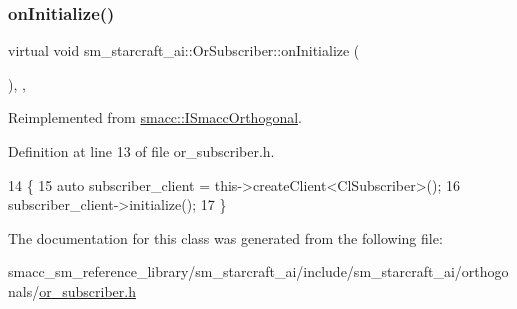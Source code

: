\subsubsection{\texorpdfstring{on\+Initialize()}{onInitialize()}}
{\footnotesize\ttfamily virtual void sm\+\_\+starcraft\+\_\+ai\+::\+Or\+Subscriber\+::on\+Initialize (\begin{DoxyParamCaption}{ }\end{DoxyParamCaption})\hspace{0.3cm}{\ttfamily [inline]}, {\ttfamily [override]}, {\ttfamily [virtual]}}



Reimplemented from \hyperlink{classsmacc_1_1ISmaccOrthogonal_a6bb31c620cb64dd7b8417f8705c79c7a}{smacc\+::\+I\+Smacc\+Orthogonal}.



Definition at line 13 of file or\+\_\+subscriber.\+h.


\begin{DoxyCode}
14     \{
15         \textcolor{keyword}{auto} subscriber\_client = this->createClient<ClSubscriber>();
16         subscriber\_client->initialize();
17     \}
\end{DoxyCode}


The documentation for this class was generated from the following file\+:\begin{DoxyCompactItemize}
\item 
smacc\+\_\+sm\+\_\+reference\+\_\+library/sm\+\_\+starcraft\+\_\+ai/include/sm\+\_\+starcraft\+\_\+ai/orthogonals/\hyperlink{sm__starcraft__ai_2include_2sm__starcraft__ai_2orthogonals_2or__subscriber_8h}{or\+\_\+subscriber.\+h}\end{DoxyCompactItemize}
